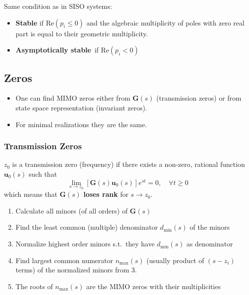 
\newpar{}

Same condition as in SISO systems:
\begin{itemize}
    \item \textbf{Stable} if $\mathrm{Re}(p_i \le 0)$ and the algebraic multiplicity of poles with zero real part is equal to their geometric multiplicity.
    \item \textbf{Asymptotically stable}\ if $\mathrm{Re}(p_i<0)$
\end{itemize}


\subsection{Zeros}
\begin{itemize}
    \item One can find MIMO zeros either from $\mathbf{G}(s)$ (transmission zeros) or from state space representation (invariant zeros).
    \item For minimal realizations they are the same.
\end{itemize}

\subsubsection{Transmission Zeros}

$z_0$ is a transmission zero (frequency) if there exists a non-zero, rational function $\mathbf{u}_0(s)$ such that
\begin{equation*}
    \lim_{s\to z_0}\left[\mathbf{G}(s)\mathbf{u}_0(s)\right]e^{st}=0,\quad\forall t\geq0
\end{equation*}
which means that $\mathbf{\mathbf{G}}(s)$ \textbf{loses rank} for $s\to z_0$.


\begin{enumerate}
    \item Calculate all minors (of all orders) of $\mathbf{G}(s)$
    \item Find the least common (multiple) denominator $d_{\min}(s)$ of the minors
    \item Normalize highest order minors s.t.\ they have $d_{\min}(s)$ as denominator
    \item Find largest common numerator $n_{\max}(s)$ (usually product of $(s-z_i)$ terms) of the normalized minors from 3.
    \item The roots of $n_{\max}(s)$ are the MIMO zeros with their multiplicities
\end{enumerate}

